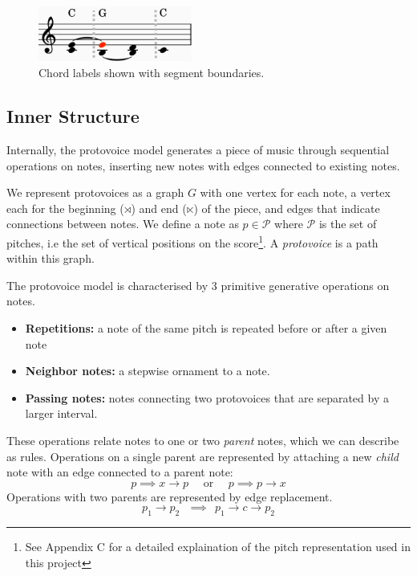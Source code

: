 \documentclass[12pt,a4paper,twoside,openright]{report}
\theoremstyle{definition}
\begin{document}
\begin{figure}
  \centering
  \includegraphics[width=0.45\textwidth]{prep/cadenceharmony}
  \captionsetup{width=.9\linewidth}
  \caption{Chord labels shown with segment boundaries.}
  \label{fig:cadenceHarmony}
\end{figure}

\FloatBarrier

\subsection{Inner Structure} %
\label{sub:Inner Structure}

Internally, the protovoice model generates a piece of music through sequential operations on notes, inserting new notes with edges connected to existing notes.

We represent protovoices as a graph $G$ with one vertex for each note, a vertex each for the beginning ($\rtimes$) and end ($\ltimes$) of the piece, and edges that indicate connections between notes.
We define a note as $p \in \mathcal{P}$ where $\mathcal{P}$ is the set of pitches, i.e the set of vertical positions on the score\footnote{See Appendix C for a detailed explaination of the pitch representation used in this project}. 
A \textit{protovoice} is a path within this graph.

\par 
The protovoice model is characterised by 3 primitive generative operations on notes.

\begin{itemize}
  \item \textbf{Repetitions:} a note of the same pitch is repeated before or after a given note
  \item \textbf{Neighbor notes:} a stepwise ornament to a note. 
  \item \textbf{Passing notes:} notes connecting two protovoices that are separated by a larger interval.
\end{itemize}

These operations relate notes to one or two \textit{parent} notes, which we can describe as rules. Operations on a single parent are represented by attaching a new \textit{child} note with an edge connected to a parent note: 
\begin{equation}
  p \implies x \to p \text{~~~~or~~~~} p \implies p \to x 
  \label{eq:singlesidedinnerop}
\end{equation}
Operations with two parents are represented by edge replacement. 
\begin{equation}
  p_1 \to p_2 ~~~\implies~~ p_1 \to c \to p_2 \label{edge replacement}
  \label{eq:doublesidedinnerop}
\end{equation}
\end{document}
